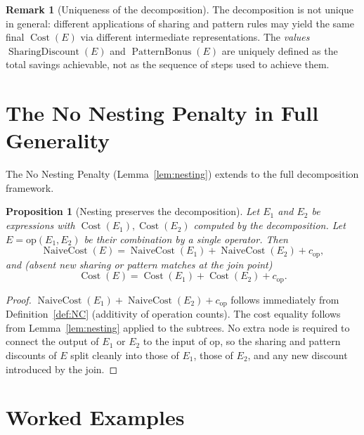 \documentclass[12pt,a4paper]{article}
\newtheorem{proposition}[theorem]{Proposition}
\theoremstyle{definition}
\newtheorem{remark}[theorem]{Remark}
\newcommand{\Cost}{\operatorname{Cost}}
\newcommand{\NC}{\operatorname{NaiveCost}}
\newcommand{\SD}{\operatorname{SharingDiscount}}
\newcommand{\PB}{\operatorname{PatternBonus}}
\begin{document}
\begin{remark}[Uniqueness of the decomposition]
The decomposition is not unique in general: different applications of
sharing and pattern rules may yield the same final $\Cost(E)$ via
different intermediate representations.  The \emph{values}
$\SD(E)$ and $\PB(E)$ are uniquely defined as the total savings
achievable, not as the sequence of steps used to achieve them.
\end{remark}

\section{The No Nesting Penalty in Full Generality}
\label{sec:nonesting}

The No Nesting Penalty (Lemma~\ref{lem:nesting}) extends to the
full decomposition framework.

\begin{proposition}[Nesting preserves the decomposition]
\label{prop:nestdecomp}
Let $E_1$ and $E_2$ be expressions with $\Cost(E_1), \Cost(E_2)$ computed
by the decomposition.  Let $E = \mathrm{op}(E_1, E_2)$ be their combination
by a single operator.  Then
\[
  \NC(E) = \NC(E_1) + \NC(E_2) + c_{\mathrm{op}},
\]
and (absent new sharing or pattern matches at the join point)
\[
  \Cost(E) = \Cost(E_1) + \Cost(E_2) + c_{\mathrm{op}}.
\]
\end{proposition}

\begin{proof}
$\NC(E_1) + \NC(E_2) + c_{\mathrm{op}}$ follows immediately from
Definition~\ref{def:NC} (additivity of operation counts).
The cost equality follows from Lemma~\ref{lem:nesting} applied
to the subtrees.  No extra node is required to connect the output
of $E_1$ or $E_2$ to the input of $\mathrm{op}$, so the sharing
and pattern discounts of $E$ split cleanly into those of $E_1$,
those of $E_2$, and any new discount introduced by the join.
\end{proof}

\section{Worked Examples}
\label{sec:examples}
\end{document}
